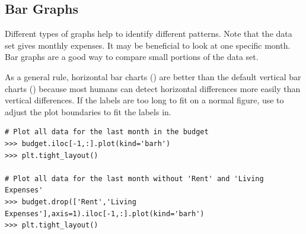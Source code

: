\subsection*{Bar Graphs}

Different types of graphs help to identify different patterns.
Note that the data set  gives monthly expenses.
It may be beneficial to look at one specific month.
Bar graphs are a good way to compare small portions of the data set.

As a general rule, horizontal bar charts () are better than the default vertical bar charts () because most humans can detect horizontal differences more easily than vertical differences.
If the labels are too long to fit on a normal figure, use  to adjust the plot boundaries to fit the labels in.

\begin{lstlisting}
# Plot all data for the last month in the budget
>>> budget.iloc[-1,:].plot(kind='barh')
>>> plt.tight_layout()

# Plot all data for the last month without 'Rent' and 'Living Expenses'
>>> budget.drop(['Rent','Living Expenses'],axis=1).iloc[-1,:].plot(kind='barh')
>>> plt.tight_layout()
\end{lstlisting}

